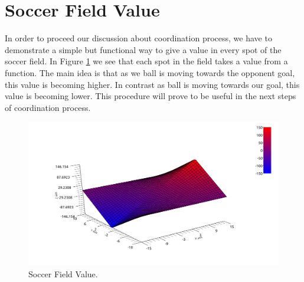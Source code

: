 \section{Soccer Field Value}
\label{FieldValue}
In order to proceed our discussion about coordination process, we have to demonstrate a simple but functional way to give a value in every spot of the soccer field. In Figure \ref{fig:SoccerValue} we see that each spot in the field takes a value from a function. The main idea is that as we ball is moving towards the opponent goal,  this value is becoming higher. In contrast as ball is moving towards our goal, this value is becoming lower. This procedure will prove to be useful in the next steps of coordination process.
\begin{figure}[htb!]
\centering
  \includegraphics[width=\textwidth]{Chapter4/figures/Graph1.pdf}
  \caption{Soccer Field Value.} 
  \label{fig:SoccerValue}
\end{figure}

